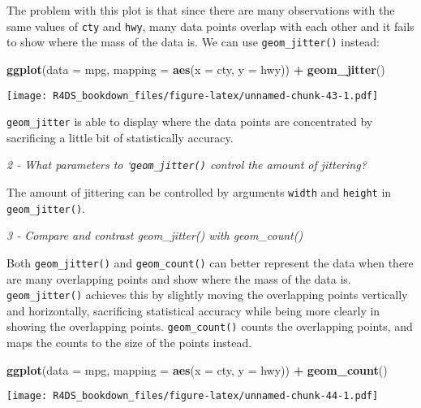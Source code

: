 \documentclass[]{article}
\newenvironment{Shaded}{\begin{snugshade}}{\end{snugshade}}
\newcommand{\KeywordTok}[1]{\textcolor[rgb]{0.13,0.29,0.53}{\textbf{#1}}}
\newcommand{\DataTypeTok}[1]{\textcolor[rgb]{0.13,0.29,0.53}{#1}}
\newcommand{\StringTok}[1]{\textcolor[rgb]{0.31,0.60,0.02}{#1}}
\newcommand{\OperatorTok}[1]{\textcolor[rgb]{0.81,0.36,0.00}{\textbf{#1}}}
\newcommand{\NormalTok}[1]{#1}
\theoremstyle{definition}
\theoremstyle{definition}
\theoremstyle{definition}
\theoremstyle{remark}
\begin{document}
The problem with this plot is that since there are many observations
with the same values of \texttt{cty} and \texttt{hwy}, many data points
overlap with each other and it fails to show where the mass of the data
is. We can use \texttt{geom\_jitter()} instead:

\begin{Shaded}
\begin{Highlighting}[]
\KeywordTok{ggplot}\NormalTok{(}\DataTypeTok{data =}\NormalTok{ mpg, }\DataTypeTok{mapping =} \KeywordTok{aes}\NormalTok{(}\DataTypeTok{x =}\NormalTok{ cty, }\DataTypeTok{y =}\NormalTok{ hwy)) }\OperatorTok{+}\StringTok{ }
\StringTok{  }\KeywordTok{geom_jitter}\NormalTok{()}
\end{Highlighting}
\end{Shaded}

\texttt{[image: R4DS\_bookdown\_files/figure-latex/unnamed-chunk-43-1.pdf]}

\texttt{geom\_jitter} is able to display where the data points are
concentrated by sacrificing a little bit of statistically accuracy.

\emph{2 - What parameters to `\texttt{geom\_jitter()} control the amount
of jittering?}

The amount of jittering can be controlled by arguments \texttt{width}
and \texttt{height} in \texttt{geom\_jitter()}.

\emph{3 - Compare and contrast geom\_jitter() with geom\_count()}

Both \texttt{geom\_jitter()} and \texttt{geom\_count()} can better
represent the data when there are many overlapping points and show where
the mass of the data is. \texttt{geom\_jitter()} achieves this by
slightly moving the overlapping points vertically and horizontally,
sacrificing statistical accuracy while being more clearly in showing the
overlapping points. \texttt{geom\_count()} counts the overlapping
points, and maps the counts to the size of the points instead.

\begin{Shaded}
\begin{Highlighting}[]
\KeywordTok{ggplot}\NormalTok{(}\DataTypeTok{data =}\NormalTok{ mpg, }\DataTypeTok{mapping =} \KeywordTok{aes}\NormalTok{(}\DataTypeTok{x =}\NormalTok{ cty, }\DataTypeTok{y =}\NormalTok{ hwy)) }\OperatorTok{+}\StringTok{ }
\StringTok{  }\KeywordTok{geom_count}\NormalTok{()}
\end{Highlighting}
\end{Shaded}

\texttt{[image: R4DS\_bookdown\_files/figure-latex/unnamed-chunk-44-1.pdf]}
\end{document}
